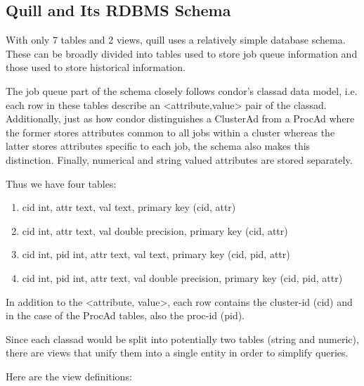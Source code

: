 \subsection{\label{sec:Quill-Schema}Quill and Its RDBMS Schema}

With only 7 tables and 2 views, quill uses a relatively simple database
schema.  These can be broadly divided into tables used to store job
queue information and those used to store historical information.

The job queue part of the schema closely follows condor's classad data
model, i.e. each row in these tables describe an <attribute,value>
pair of the classad.  Additionally, just as how condor distinguishes a
ClusterAd from a ProcAd where the former stores attributes common to all
jobs within a cluster whereas the latter stores attributes specific to
each job, the schema also makes this distinction.  Finally, numerical
and string valued attributes are stored separately.

Thus we have four tables:

\begin{enumerate}

\item 
		{cid int, 
		attr text, 
		val text, 
		primary key (cid, attr)}

\item 
		{cid int, 
		attr text, 
		val double precision, 
		primary key (cid, attr)}

\item 
		{cid int, 
		pid int, 
		attr text, 
		val text, 
		primary key (cid, pid, attr)}

\item 
		{cid int, 
		pid int, 
		attr text, 
		val double precision,
		primary key (cid, pid, attr)}

\end{enumerate}

In addition to the <attribute, value>, each row contains the cluster-id
(cid) and in the case of the ProcAd tables, also the proc-id (pid).

Since each classad would be split into potentially two tables (string
and numeric), there are views that unify them into a single entity in
order to simplify queries.

Here are the view definitions:

